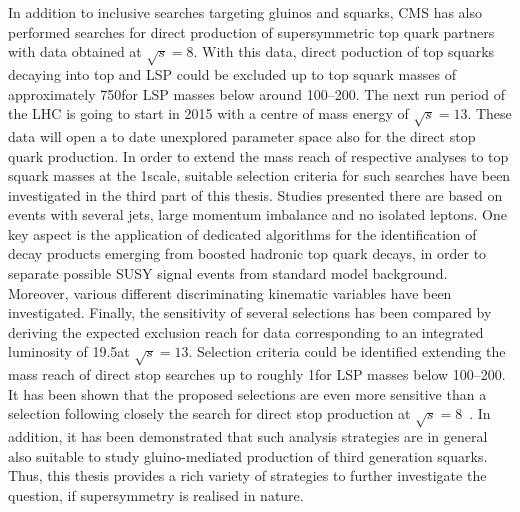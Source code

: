 In addition to inclusive searches targeting gluinos and squarks, CMS has also performed searches for direct production of supersymmetric top quark partners with data obtained at $\sqrt{s} = 8$\tev. With this data, direct poduction of top squarks decaying into top and LSP could be excluded up to top squark masses of approximately 750\gev for LSP masses below around 100--200\gev. The next run period of the LHC is going to start in 2015 with a centre of mass energy of $\sqrt{s} = 13$\tev. These data will open a to date unexplored parameter space also for the direct stop quark production. In order to extend the mass reach of respective analyses to top squark masses at the 1\tev scale, suitable selection criteria for such searches have been investigated in the third part of this thesis. Studies presented there are based on events with several jets, large momentum imbalance and no isolated leptons. One key aspect is the application of dedicated algorithms for the identification of decay products emerging from boosted hadronic top quark decays, in order to separate possible SUSY signal events from standard model background. Moreover, various different discriminating kinematic variables have been investigated. Finally, the sensitivity of several selections has been compared by deriving the expected exclusion reach for data corresponding to an integrated luminosity of 19.5\fbinv at $\sqrt{s} = 13$\tev. Selection criteria could be identified extending the mass reach of direct stop searches up to roughly 1\tev for LSP masses below 100--200\gev. It has been shown that the proposed selections are even more sensitive than a selection following closely the search for direct stop production at $\sqrt{s} = 8$\tev~\cite{CMS-PAS-SUS-13-015}. In addition, it has been demonstrated that such analysis strategies are in general also suitable to study gluino-mediated production of third generation squarks. Thus, this thesis provides a rich variety of strategies to further investigate the question, if supersymmetry is realised in nature. 


